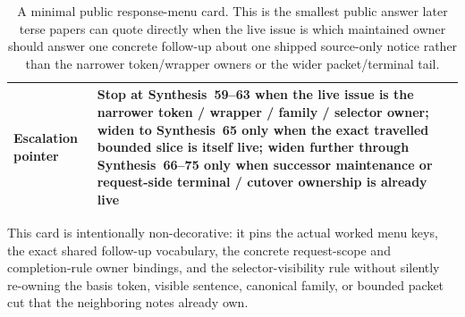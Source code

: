 \documentclass[11pt]{article}
\begin{document}
\begin{table}[t]
\begin{tabularx}{\linewidth}{@{}l X@{}}
Escalation pointer & Stop at Synthesis~59--63 when the live issue is the narrower token / wrapper / family / selector owner; widen to Synthesis~65 only when the exact travelled bounded slice is itself live; widen further through Synthesis~66--75 only when successor maintenance or request-side terminal / cutover ownership is already live \\
\bottomrule
\end{tabularx}
\caption{A minimal public response-menu card. This is the smallest public answer later terse papers can quote directly when the live issue is which maintained owner should answer one concrete follow-up about one shipped source-only notice rather than the narrower token/wrapper owners or the wider packet/terminal tail.}
\label{tab:minimal-public-response-menu-card}
\end{table}

This card is intentionally non-decorative: it pins the actual worked menu keys, the exact shared follow-up vocabulary, the concrete request-scope and completion-rule owner bindings, and the selector-visibility rule without silently re-owning the basis token, visible sentence, canonical family, or bounded packet cut that the neighboring notes already own.\cite{series:workedexample}
\end{document}
